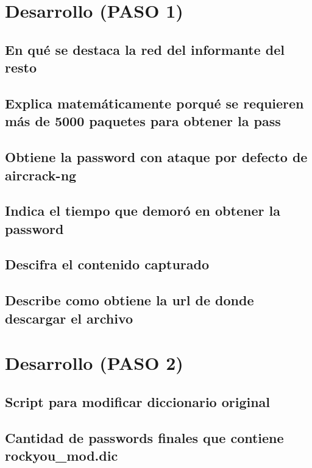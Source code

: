 \documentclass[letter,12pt]{article}
\begin{document}
\section{Desarrollo (PASO 1)}

\subsection{En qué se destaca la red del informante del resto}

\subsection{Explica matemáticamente porqué se requieren más de 5000 paquetes para obtener la pass}

\subsection{Obtiene la password con ataque por defecto de aircrack-ng}


\subsection{Indica el tiempo que demoró en obtener la password}

\subsection{Descifra el contenido capturado}

\subsection{Describe como obtiene la url de donde descargar el archivo}


\section{Desarrollo (PASO 2)}

\subsection{Script para modificar diccionario original}

\subsection{Cantidad de passwords finales que contiene rockyou\_mod.dic}
\end{document}
